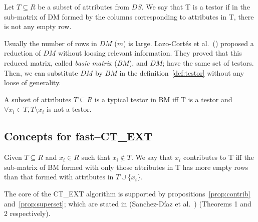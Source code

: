 \documentclass[citeauthoryear]{llncs}
\begin{document}
	\begin{definition}\label{def:testor}
		Let $T \subseteq R$ be a subset of attributes from $DS$. We say that T is a testor if in the sub-matrix
		of DM formed by the columns corresponding to attributes in T, there is not any empty row.
	\end{definition}
	
	
	Usually the number of rows in $DM$ ($m$) is large. Lazo-Cort\'es et al.~(\cite{Lazo2001}) proposed a reduction of $DM$ without loosing relevant information. They proved that this reduced matrix, called \textit{basic matrix} ($BM$), and $DM$; have the same set of testors. Then, we can substitute $DM$ by $BM$ in the definition~\ref{def:testor} without any loose of generality. 
	
	
	
	\begin{definition}\label{def:TT}
		A subset of attributes $T \subseteq R$ is a typical testor in BM iff T is a testor and $\forall x_i \in T, T \setminus x_i$ is not a testor. 
	\end{definition}
		
%	
\subsection{Concepts for fast--CT\_EXT}
%
		
	\begin{definition}\label{def:contrib}
		Given $T \subseteq R$ and $x_i \in R$ such that $x_i \notin T$. We say that $x_i$ contributes to T iff the sub-matrix of BM formed with only those attributes in T has more empty rows than that formed with attributes in $T \cup \lbrace x_i \rbrace$.
	\end{definition}	
	
	The core of the CT\_EXT algorithm is supported by propositions~\ref{prop:contrib} and~\ref{prop:superset}; which are stated in (Sanchez-D\'iaz et al.~\cite{Sanchez2010}) (Theorems 1 and 2 respectively).
	
\end{document}
